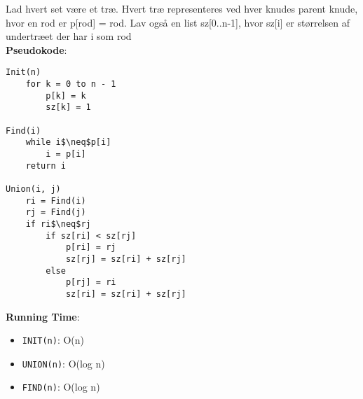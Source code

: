 Lad hvert set være et træ. Hvert træ representeres ved hver knudes parent knude, hvor en rod er p[rod] = rod. Lav også en list sz[0..n-1], hvor sz[i] er størrelsen af undertræet der har i som rod\\
\textbf{Pseudokode}:
\begin{lstlisting}[frame=single, mathescape=true]
Init(n)
	for k = 0 to n - 1
		p[k] = k
		sz[k] = 1

Find(i)
	while i$\neq$p[i]
		i = p[i]
	return i

Union(i, j)
	ri = Find(i)
	rj = Find(j)
	if ri$\neq$rj
		if sz[ri] < sz[rj]
			p[ri] = rj
			sz[rj] = sz[ri] + sz[rj]
		else
			p[rj] = ri
			sz[ri] = sz[ri] + sz[rj]
\end{lstlisting}
\textbf{Running Time}:
\begin{itemize}
	\item \texttt{INIT(n)}: O(n)
	\item \texttt{UNION(n)}: O(log n)
	\item \texttt{FIND(n)}: O(log n)
\end{itemize}